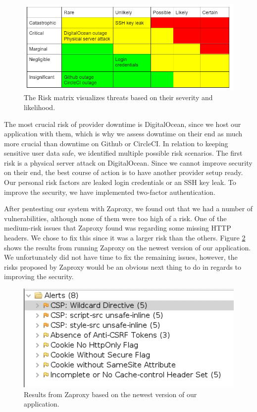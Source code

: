 \begin{figure}[H]
    \centering
    \includegraphics[scale=0.85]{images/risk_matrix.png}
    \caption{The Risk matrix visualizes threats based on their severity and likelihood.}
    \label{fig:Risk_matrix}
\end{figure}

The most crucial risk of provider downtime is DigitalOcean, since we host our application with them, which is why we assess downtime on their end as much more crucial than downtime on Github or CircleCI.
\newline
In relation to keeping sensitive user data safe, we identified multiple possible risk scenarios.
The first risk is a physical server attack on DigitalOcean. Since we cannot improve security on their end, the best course of action is to have another provider setup ready. Our personal risk factors are leaked login credentials or an SSH key leak. To improve the security, we have implemented two-factor authentication.

After pentesting our system with Zaproxy, we found out that we had a number of vulnerabilities, although none of them were too high of a risk. 
One of the medium-risk issues that Zaproxy found was regarding some missing HTTP headers. We chose to fix this since it was a larger risk than the others. Figure \ref{fig:Zaproxy_Updated} shows the results from running Zaproxy on the newest version of our application. We unfortunately did not have time to fix the remaining issues, however, the risks proposed by Zaproxy would be an obvious next thing to do in regards to improving the security.
\newline
\begin{figure}[H]
    \centering
    \includegraphics[scale=0.50]{images/security_risks_updated.png}
    \caption{Results from Zaproxy based on the newest version of our application.}
    \label{fig:Zaproxy_Updated}
\end{figure}


